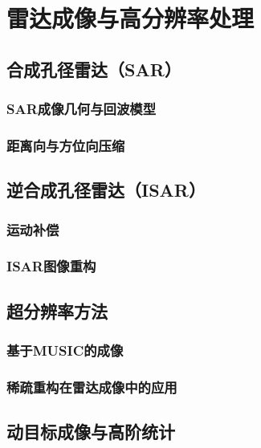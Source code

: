 \chapter{雷达成像与高分辨率处理}
\section{合成孔径雷达（SAR）}
\subsection{SAR成像几何与回波模型}
\subsection{距离向与方位向压缩}
\section{逆合成孔径雷达（ISAR）}
\subsection{运动补偿}
\subsection{ISAR图像重构}
\section{超分辨率方法}
\subsection{基于MUSIC的成像}
\subsection{稀疏重构在雷达成像中的应用}
\section{动目标成像与高阶统计}